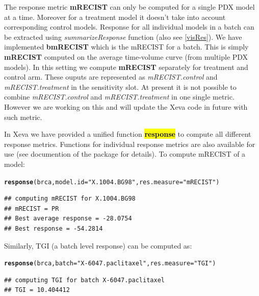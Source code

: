\documentclass{article}\usepackage[]{graphicx}\usepackage[]{xcolor}
\makeatletter
\newcommand{\hlstr}[1]{\textcolor[rgb]{0.192,0.494,0.8}{#1}}%
\newcommand{\hlstd}[1]{\textcolor[rgb]{0.345,0.345,0.345}{#1}}%
\newcommand{\hlkwc}[1]{\textcolor[rgb]{0.333,0.667,0.333}{#1}}%
\newcommand{\hlkwd}[1]{\textcolor[rgb]{0.737,0.353,0.396}{\textbf{#1}}}%
\newenvironment{kframe}{%
 \def\at@end@of@kframe{}%
 \ifinner\ifhmode%
  \def\at@end@of@kframe{\end{minipage}}%
  \begin{minipage}{\columnwidth}%
 \fi\fi%
 \def\FrameCommand##1{\hskip\@totalleftmargin \hskip-\fboxsep
 \colorbox{shadecolor}{##1}\hskip-\fboxsep
     \hskip-\linewidth \hskip-\@totalleftmargin \hskip\columnwidth}%
 \MakeFramed {\advance\hsize-\width
   \@totalleftmargin\z@ \linewidth\hsize
   \@setminipage}}%
 {\par\unskip\endMakeFramed%
 \at@end@of@kframe}
\newenvironment{knitrout}{}{} %
\makeatother
\begin{document}
\begin{tcolorbox}[fonttitle=\sffamily\bfseries\large,
title=Note: mRECIST and bmRECIST]
The response metric \textbf{mRECIST} can only be computed for a single PDX model at a time.
Moreover for a treatment model it doesn't take into account corresponding control models.
Response for all individual models in a batch can be extracted using \textit{summarizeResponse} function (also see \ref{visRes}).
We have implemented \textbf{bmRECIST}  which is the mRECIST for a batch.
This is simply \textbf{mRECIST} computed on the average time-volume curve
(from multiple PDX models).
In this setting we compute \textbf{mRECIST} separately for treatment and control arm.
These ouputs are represented as \textit{mRECIST.control} and \textit{mRECIST.treatment}
in the sensitivity slot.
At present it is not possible to combine \textit{mRECIST.control} and \textit{mRECIST.treatment} in one single metric. However we are working on this and  will update the Xeva code in future with such metric.

\end{tcolorbox}


In Xeva we have provided a unified function \textbf{\textcolor{red}{\hl{response}}}
to compute all different response metrics.
Functions for individual response metrics are also available for use (see documention of the package for details).
To compute mRECIST of a model:

\begin{knitrout}
\color{fgcolor}\begin{kframe}
\begin{alltt}
\hlkwd{response}\hlstd{(brca,} \hlkwc{model.id}\hlstd{=}\hlstr{"X.1004.BG98"}\hlstd{,} \hlkwc{res.measure}\hlstd{=}\hlstr{"mRECIST"}\hlstd{)}
\end{alltt}
\begin{verbatim}
## computing mRECIST for X.1004.BG98
## mRECIST = PR
## Best average response = -28.0754
## Best response = -54.2814
\end{verbatim}
\end{kframe}
\end{knitrout}

Similarly, TGI (a batch level response) can be computed as:
\begin{knitrout}
\color{fgcolor}\begin{kframe}
\begin{alltt}
\hlkwd{response}\hlstd{(brca,} \hlkwc{batch}\hlstd{=}\hlstr{"X-6047.paclitaxel"}\hlstd{,} \hlkwc{res.measure}\hlstd{=}\hlstr{"TGI"}\hlstd{)}
\end{alltt}
\begin{verbatim}
## computing TGI for batch X-6047.paclitaxel
## TGI = 10.404412
\end{verbatim}
\end{kframe}
\end{knitrout}
\end{document}
